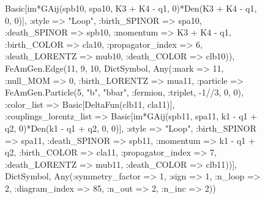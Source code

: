 \documentclass{revtex4}
\begin{document}
\begin{figure}[!htb]
\begin{center}
{Basic[im*GAij(spb10, spa10, K3 + K4 - q1, 0)*Den(K3 + K4 - q1, 0, 0)], :style => "Loop", :birth_SPINOR => spa10, :death_SPINOR => spb10, :momentum => K3 + K4 - q1, :birth_COLOR => cla10, :propagator_index => 6, :death_LORENTZ => mub10, :death_COLOR => clb10)), FeAmGen.Edge(11, 9, 10, Dict{Symbol, Any}(:mark => 11, :null_MOM => 0, :birth_LORENTZ => mua11, :particle => FeAmGen.Particle(5, "b", "bbar", :fermion, :triplet, -1//3, 0, 0), :color_list => Basic[DeltaFun(clb11, cla11)], :couplings_lorentz_list => Basic[im*GAij(spb11, spa11, k1 - q1 + q2, 0)*Den(k1 - q1 + q2, 0, 0)], :style => "Loop", :birth_SPINOR => spa11, :death_SPINOR => spb11, :momentum => k1 - q1 + q2, :birth_COLOR => cla11, :propagator_index => 7, :death_LORENTZ => mub11, :death_COLOR => clb11))], Dict{Symbol, Any}(:symmetry_factor => 1, :sign => 1, :n_loop => 2, :diagram_index => 85, :n_out => 2, :n_inc => 2)) 
}
\end{center}
\end{figure}
\end{document}
